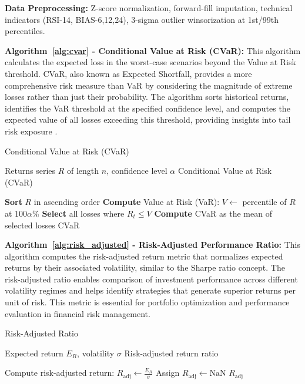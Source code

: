 \documentclass[3p,times,procedia]{elsarticle}
\begin{document}
\textbf{Data Preprocessing:} Z-score normalization, forward-fill imputation, technical indicators (RSI-14, BIAS-6,12,24), 3-sigma outlier winsorization at 1st/99th percentiles.

\textbf{Algorithm~\ref{alg:cvar} - Conditional Value at Risk (CVaR):} This algorithm calculates the expected loss in the worst-case scenarios beyond the Value at Risk threshold. CVaR, also known as Expected Shortfall, provides a more comprehensive risk measure than VaR by considering the magnitude of extreme losses rather than just their probability. The algorithm sorts historical returns, identifies the VaR threshold at the specified confidence level, and computes the expected value of all losses exceeding this threshold, providing insights into tail risk exposure \cite{Rockafellar2000}.

\begin{algorithm}[H]
\caption{Conditional Value at Risk (CVaR)}
\label{alg:cvar}
\begin{algorithmic}[1]
    \Require Returns series $R$ of length $n$, confidence level $\alpha$
    \Ensure Conditional Value at Risk (CVaR)
    
    \State \textbf{Sort} $R$ in ascending order 
    \State \textbf{Compute} Value at Risk (VaR): $V \gets$ percentile of $R$ at $100\alpha$\%
    \State \textbf{Select} all losses where $R_t \leq V$
    \State \textbf{Compute} CVaR as the mean of selected losses
    \State \Return CVaR
\end{algorithmic}
\end{algorithm}

\textbf{Algorithm~\ref{alg:risk_adjusted} - Risk-Adjusted Performance Ratio:} This algorithm computes the risk-adjusted return metric that normalizes expected returns by their associated volatility, similar to the Sharpe ratio concept. The risk-adjusted ratio enables comparison of investment performance across different volatility regimes and helps identify strategies that generate superior returns per unit of risk. This metric is essential for portfolio optimization and performance evaluation in financial risk management.

\begin{algorithm}[H]
\caption{Risk-Adjusted Ratio}
\label{alg:risk_adjusted}
\begin{algorithmic}[1]
    \Require Expected return $E_R$, volatility $\sigma$
    \Ensure Risk-adjusted return ratio
    
        \State Compute risk-adjusted return: $R_{\text{adj}} \gets \frac{E_R}{\sigma}$
    \Else
        \State Assign $R_{\text{adj}} \gets \text{NaN}$
    \EndIf
    \State \Return $R_{\text{adj}}$
\end{algorithmic}
\end{algorithm}
\end{document}
